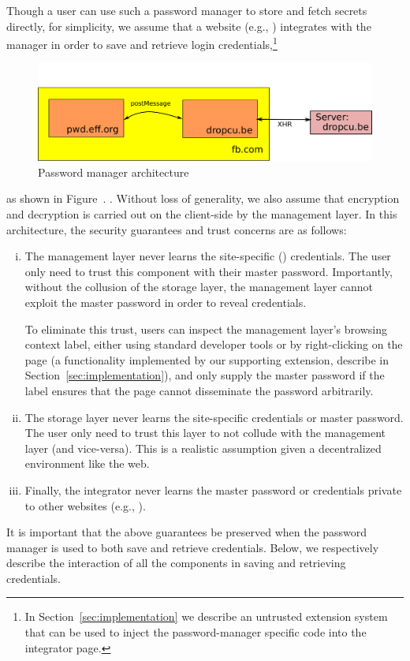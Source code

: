 %
Though a user can use such a password manager to store and fetch secrets
directly, for simplicity, we assume that a website (e.g., )
integrates with the manager in order to save and retrieve login
credentials,\footnote{ In Section~\ref{sec:implementation} we describe an
  untrusted extension system that can be used to inject the password-manager
  specific code into the integrator page.  }
\iffigures
\begin{figure}
\begin{center}
\includegraphics[scale=0.35]{pmanager.pdf}
\end{center}
\caption{\label{fig:manager-s-1} Password manager architecture}
\end{figure}
 as shown in
Figure~.
\else
.
\fi
%
Without loss of generality, we also assume that encryption and
decryption is carried out on the client-side by the management layer.
%
In this architecture, the security guarantees and trust concerns
are as follows:
\begin{enumerate}[i)]
\item The management layer never learns the site-specific ()
  credentials. The user only need to trust this component with their master
  password. Importantly, without the collusion of the storage layer, the
  management layer cannot exploit the master password in order to reveal
  credentials.

  To eliminate this trust, users can inspect the management layer's
  browsing context label, either using standard developer tools or by
  right-clicking on the page (a functionality implemented by our
  supporting extension, describe in Section~\ref{sec:implementation}),
  and only supply the master password if the label ensures that the
  page cannot disseminate the password arbitrarily.

\item The storage layer never learns the site-specific credentials or
  master password. The user only need to trust this layer to not
  collude with the management layer (and vice-versa). This is a
  realistic assumption given a decentralized environment like the web.

\item Finally, the integrator never learns the master password or
  credentials private to other websites (e.g., ).
\end{enumerate}
%
It is important that the above guarantees be preserved when the
password manager is used to both save and retrieve credentials.
%
Below, we respectively describe the interaction of all the components
in saving and retrieving credentials.

